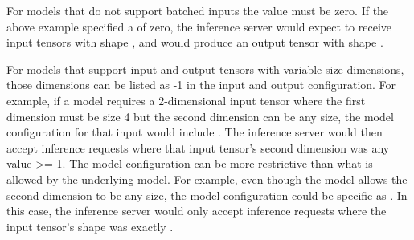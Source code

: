 \documentclass[letterpaper,10pt,english]{sphinxmanual}
\begin{document}
For models that do not support batched inputs the
 value must be
zero. If the above example specified a  of zero, the
inference server would expect to receive input tensors with shape \sphinxstylestrong{{[}
16 {]}}, and would produce an output tensor with shape \sphinxstylestrong{{[} 16 {]}}.

For models that support input and output tensors with variable-size
dimensions, those dimensions can be listed as -1 in the input and
output configuration. For example, if a model requires a 2-dimensional
input tensor where the first dimension must be size 4 but the second
dimension can be any size, the model configuration for that input
would include . The inference server would then
accept inference requests where that input tensor’s second dimension
was any value \textgreater{}= 1. The model configuration can be more restrictive
than what is allowed by the underlying model. For example, even though
the model allows the second dimension to be any size, the model
configuration could be specific as . In this case,
the inference server would only accept inference requests where the
input tensor’s shape was exactly \sphinxstylestrong{{[} 4, 4 {]}}.
\end{document}
